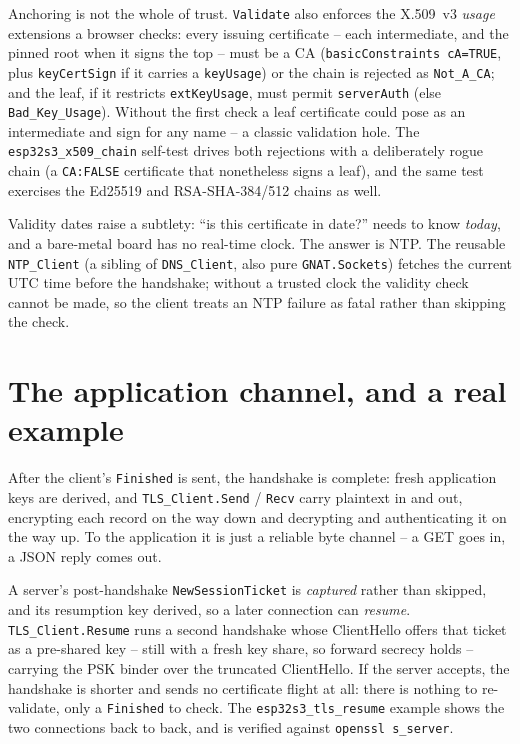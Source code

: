 Anchoring is not the whole of trust. \texttt{Validate} also enforces the
X.509~v3 \emph{usage} extensions a browser checks: every issuing certificate --
each intermediate, and the pinned root when it signs the top -- must be a CA
(\texttt{basicConstraints}~\texttt{cA=TRUE}, plus \texttt{keyCertSign} if it
carries a \texttt{keyUsage}) or the chain is rejected as \texttt{Not\_A\_CA}; and
the leaf, if it restricts \texttt{extKeyUsage}, must permit \texttt{serverAuth}
(else \texttt{Bad\_Key\_Usage}). Without the first check a leaf certificate could
pose as an intermediate and sign for any name -- a classic validation hole. The
\texttt{esp32s3\_x509\_chain} self-test drives both rejections with a deliberately
rogue chain (a \texttt{CA:FALSE} certificate that nonetheless signs a leaf), and
the same test exercises the Ed25519 and RSA-SHA-384/512 chains as well.

Validity dates raise a subtlety: ``is this certificate in date?'' needs to know
\emph{today}, and a bare-metal board has no real-time clock. The answer is NTP.
The reusable \texttt{NTP\_Client} (a sibling of \texttt{DNS\_Client}, also pure
\texttt{GNAT.Sockets}) fetches the current UTC time before the handshake; without a
trusted clock the validity check cannot be made, so the client treats an NTP
failure as fatal rather than skipping the check.

\section{The application channel, and a real example}
\label{ch:tls:app}

After the client's \texttt{Finished} is sent, the handshake is complete: fresh
application keys are derived, and \texttt{TLS\_Client.Send} / \texttt{Recv} carry
plaintext in and out, encrypting each record on the way down and decrypting and
authenticating it on the way up. To the application it is just a reliable byte
channel -- a GET goes in, a JSON reply comes out.

A server's post-handshake \texttt{NewSessionTicket} is \emph{captured} rather than
skipped, and its resumption key derived, so a later connection can \emph{resume}.
\texttt{TLS\_Client.Resume} runs a second handshake whose ClientHello offers that
ticket as a pre-shared key -- still with a fresh key share, so forward secrecy
holds -- carrying the PSK binder over the truncated ClientHello. If the server
accepts, the handshake is shorter and sends no certificate flight at all: there is
nothing to re-validate, only a \texttt{Finished} to check. The
\texttt{esp32s3\_tls\_resume} example shows the two connections back to back, and
is verified against \texttt{openssl s\_server}.

